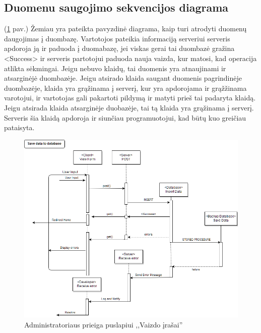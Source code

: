 \documentclass{VUMIFPSkursinis}
\begin{document}
		\subsection{Duomenu saugojimo sekvencijos diagrama} (\ref{fig:saugojimo} pav.)
		Žemiau yra pateikta pavyzdinė diagrama, kaip turi atrodyti duomenų daugojimas į duombazę. Vartotojos pateikia informaciją serveriui serveris apdoroja ją ir paduoda į duomabazę, jei viskas gerai tai duombazė gražina <Success> ir serveris partotojui paduoda nauja vaizda, kur matosi, kad operacija atlikta sėkmingai. Jeigu nebuvo klaidų, tai duomenis yra atnaujinami ir atsarginėjė duombazėje. Jeigu atsirado klaida saugant duomenis pagrindinėje duombazėje, klaida yra grąžinama į serverį, kur yra apdorojama ir grąžžinama varotojui, ir vartotojas gali pakartoti pildymą ir matyti prieš tai padaryta klaidą. Jeigu atsirada klaida atsarginėje duobazėje, tai tą klaida yra grąžinama į serverį. Serveris šia klaidą apdoroja ir siunčiau programuotojui, kad būtų kuo greičiau pataisyta. 
		
		\begin{figure}[H]
			\centering
			\includegraphics[width=\textwidth]{img/PSI5/SavingSequence.png}
			\caption{Administratoriaus prieiga puslapiui ,,Vaizdo įrašai''}
			\label{fig:saugojimo}
		\end{figure}
		
\end{document}
